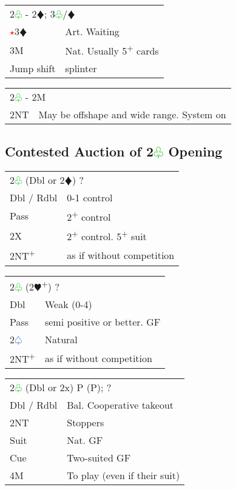\documentclass{article}
\renewcommand{\sp}{\textcolor{RoyalBlue}{$\varspade$}}
\newcommand{\he}{\textcolor{RubineRed}{$\varheart$}}
\newcommand{\di}{\textcolor{Peach}{$\vardiamond$}}
\newcommand{\cl}{\textcolor{LimeGreen}{$\varclub$}}
\newcommand{\nt}{\relsize{-1}NT\relsize{1}}
\newcommand{\up}{\textsuperscript{+}}
\newcommand{\al}{\textcolor{red}{$\star$}}
\begin{document}
\medskip

\begin{tabular}{|l|p{6.5cm}}
	\multicolumn{2}{l}{2\cl{} - 2\di{}; 3\cl{}/\di{}}\\
	\al{}3\di{} & Art. Waiting \\
	3M & Nat. Usually 5\up{} cards \\
	Jump shift & splinter \\
\end{tabular}

\medskip

\begin{tabular}{|l|p{6.5cm}}
	\multicolumn{2}{l}{2\cl{} - 2M}\\
	2\nt{} & May be offshape and wide range. System on \\
\end{tabular}


\subsection{Contested Auction of 2\cl{} Opening}

\begin{tabular}{|l|p{6.5cm}}
	\multicolumn{2}{l}{2\cl{} (Dbl or 2\di{}) ?}\\
	Dbl / Rdbl & 0-1 control \\
	Pass & 2\up{} control \\
	2X & 2\up{} control. 5\up{} suit \\
	2\nt{}\up{} & as if without competition \\
\end{tabular}

\medskip

\begin{tabular}{|l|p{6.5cm}}
	\multicolumn{2}{l}{2\cl{} (2\he{}\up{}) ?}\\
	Dbl & Weak (0-4) \\
	Pass & semi positive or better. GF \\
	2\sp{} & Natural \\
	2\nt{}\up{} & as if without competition \\
\end{tabular}

\medskip

\begin{tabular}{|l|p{6.5cm}}
	\multicolumn{2}{l}{2\cl{} (Dbl or 2x) P (P); ?}\\
	Dbl / Rdbl & Bal. Cooperative takeout \\
	2\nt{} & Stoppers \\
	Suit & Nat. GF \\
	Cue & Two-suited GF \\
	4M & To play (even if their suit) \\
\end{tabular}
\end{document}

